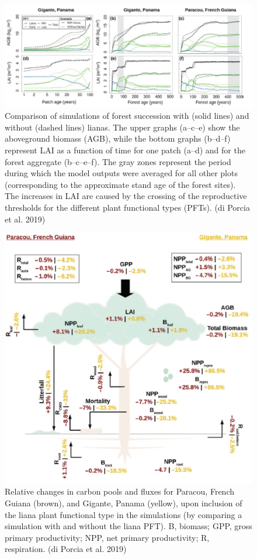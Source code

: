\documentclass[
  12pt,
  oneside]{book}
\begin{document}
\begin{figure}

{\centering \includegraphics[width=0.8\linewidth]{figures/chap7/f724_porcia3} 

}

\caption{Comparison of simulations of forest succession with (solid lines) and without (dashed lines) lianas. The upper graphs (a–c–e) show the aboveground biomass (AGB), while the bottom graphs (b–d–f) represent LAI as a function of time for one patch (a–d) and for the forest aggregate (b–c–e–f). The gray zones represent the period during which the model outputs were averaged for all other plots (corresponding to the approximate stand age of the forest sites). The increases in LAI are caused by the crossing of the reproductive thresholds for the different plant functional types (PFTs). (di Porcia et al. 2019)}\label{fig:f724}
\end{figure}

\begin{figure}

{\centering \includegraphics[width=0.8\linewidth]{figures/chap7/f725_porcia4} 

}

\caption{Relative changes in carbon pools and fluxes for Paracou, French Guiana (brown), and Gigante, Panama (yellow), upon inclusion of the liana plant functional type in the simulations (by comparing a simulation with and without the liana PFT). B, biomass; GPP, gross primary productivity; NPP, net primary productivity; R, respiration. (di Porcia et al. 2019)}\label{fig:f725}
\end{figure}
\end{document}
